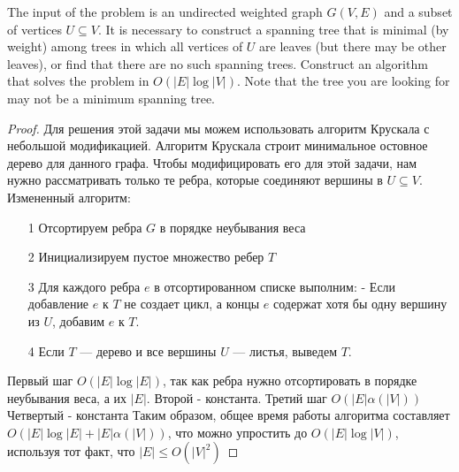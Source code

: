\begin{prob}
The input of the problem is an undirected weighted graph $G(V, E)$ and a subset of vertices $U \subseteq V$. It is necessary to construct a spanning tree that is minimal (by weight) among trees in which all vertices of $U$ are leaves (but there may be other leaves), or find that there are no such spanning trees. Construct an algorithm that solves the problem in $O(|E| \log |V|)$. Note that the tree you are looking for may not be a minimum spanning tree.
\end{prob}
\vskip 0.2in
\begin{proof}
Для решения этой задачи мы можем использовать алгоритм Крускала с небольшой модификацией. Алгоритм Крускала строит минимальное остовное дерево для данного графа. Чтобы модифицировать его для этой задачи, нам нужно рассматривать только те ребра, которые соединяют вершины в $U\subseteq V$.
\vskip 0.1in
Измененный алгоритм:
\begin{itemize}
\item[1] Отсортируем ребра $G$ в порядке неубывания веса
\item[2] Инициализируем пустое множество ребер $T$
\item[3] Для каждого ребра $e$ в отсортированном списке выполним:
	- Если добавление $e$ к $T$ не создает цикл, а концы $e$ содержат хотя бы одну вершину из $U$, добавим $e$ к $T$.
\item[4] Если $T$ — дерево и все вершины $U$ — листья, выведем $T$.
\end{itemize}

Первый шаг $O(|E| \log |E|)$, так как ребра нужно отсортировать в порядке неубывания веса, а их $|E|$.
\vskip 0.1in
Второй - константа.
\vskip 0.1in
Третий шаг $O(|E|\alpha(|V|))$
\vskip 0.1in
Четвертый - константа
\vskip 0.1in
Таким образом, общее время работы алгоритма составляет $O(|E| \log |E| + |E|\alpha(|V|))$, что можно упростить до $O(|E| \log |V|)$, используя тот факт, что $|E| \leq O(|V|^2)$
\end{proof}


